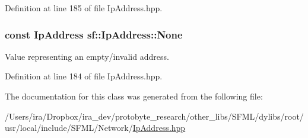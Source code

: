 Definition at line 185 of file Ip\-Address.\-hpp.

\hypertarget{classsf_1_1_ip_address_a4619b4abbe3c8fef056e7299db967404}{
\subsubsection[{None}]{\setlength{\rightskip}{0pt plus 5cm}const {\bf Ip\-Address} sf\-::\-Ip\-Address\-::\-None\hspace{0.3cm}{\ttfamily [static]}}}\label{classsf_1_1_ip_address_a4619b4abbe3c8fef056e7299db967404}


Value representing an empty/invalid address. 



Definition at line 184 of file Ip\-Address.\-hpp.



The documentation for this class was generated from the following file\-:\begin{DoxyCompactItemize}
\item 
/\-Users/ira/\-Dropbox/ira\-\_\-dev/protobyte\-\_\-research/other\-\_\-libs/\-S\-F\-M\-L/dylibs/root/usr/local/include/\-S\-F\-M\-L/\-Network/\hyperlink{_ip_address_8hpp}{Ip\-Address.\-hpp}\end{DoxyCompactItemize}
